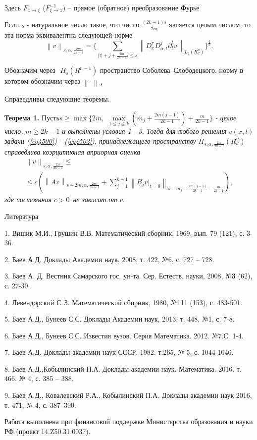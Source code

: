 Здесь $F_{x \to \xi } $ ($F_{\xi \to x}^{ - 1} )$ -- прямое (обратное)
преобразование Фурье

Если $s$ - натуральное число такое, что число $\frac{(2k - 1)s}{2m}$
является целым числом, то эта норма эквивалентна следующей норме
\[
\left\| v \right\|_{s,\alpha ,\frac{2m}{2k - 1}} = \{\sum\limits_{\left|
\tau \right| + j + \frac{2m}{2k - 1}l \leqslant s} {\left\| {D_x^\tau D_{\alpha
,t}^j \partial _t^l v} \right\|} _{L_2 (R_d^n )} \}^{\frac{1}{2}}.
\]



Обозначим через $\,\,H_s (R^{n - 1})$ пространство Со\-бо\-ле\-ва--Сло\-бо\-де\-ц\-ко\-го,
норму в котором обозначим через $\left\| \cdot \right\|\,_s \,$

Справедливы следующие теоремы.

\textbf{Теорема 1.} $Пусть s \geqslant \max \{2m,\,\,\mathop {\max }\limits_{1 \leqslant j \leqslant
k} (m_j + \frac{2m(j - 1)}{2k - 1}) + \frac{m}{2k - 1}\}$\textit{ - целое число, }$m \geqslant 2k - 1$\textit{ и выполнены условия 1 - 3. Тогда для любого решения }$v(x,t)$\textit{ задачи (\ref{eq4500}) - (\ref{eq4502}), принадлежащего пространству }$H_{s,\alpha
,\frac{2m}{2k - 1}} (R_d^n )\,$\textit{ справедлива коэрцитивная априорная оценка }
\begin{multline*}
\left\| v \right\|_{s,\alpha ,\frac{2m}{2k - 1}} \leqslant
\\ \leqslant
c(\left\| {Av}
\right\|_{s - 2m,\alpha ,\frac{2m}{2k - 1}} + \sum\limits_{j = 1}^{k - 1}
{\left\| {B_j \left. v \right|_{t = 0} } \right\|_{s - m_j - \frac{2m(j -
1)}{2k - 1} - \frac{m}{2k - 1}} } ),
\end{multline*}
\textit{где постоянная }$c > 0\,$\textit{ не зависит от }$v.$



\begin{center}
Литература
\end{center}

1. Вишик М.И., Грушин В.В. Математический сборник, 1969, вып. 79 (121), с.
3-36.

2. Баев А.Д. Доклады Академии наук, 2008, т. 422, №6, с. 727 -- 728.

3. Баев А. Д. Вестник Самарского гос. ун-та. Сер. Ес\-теств. науки, 2008,
№\textbf{3} (62), с. 27-39.

4. Левендорский С.\,З. Математический сборник, 1980, №111 (153), с. 483-501.

5. Баев А.Д., Бунеев С.С. Доклады Академии наук, 2013, т. 448, №1, с. 7-8.

6. Баев А.Д., Бунеев С.С. Известия вузов. Серия Математика. 2012. №7.С. 1-4.

7. Баев А.Д. Доклады академии наук СССР. 1982. т.265, № 5, с. 1044-1046.

8. Баев А.Д.,Кобылинский П.А. Доклады академии наук. Математика. 2016. т.
466. № 4, с. 385 -- 388.

9. Баев А.Д., Ковалевский Р.А., Кобылинский П.А. Доклады академии наук 2016,
т. 471, № 4, с. 387--390.





Работа выполнена при финансовой поддержке Ми\-ни\-с\-те\-р\-с\-т\-ва образования и науки
РФ (проект 14.Z50.31.0037).

